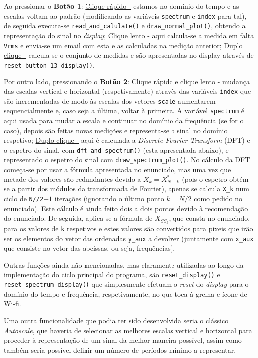 Ao pressionar o \textbf{Botão 1}: \uline{Clique rápido -} estamos no domínio do tempo e as escalas voltam ao padrão (modificando as variáveis \texttt{spectrum} e \texttt{index} para tal), de seguida executa-se \texttt{read\_and\_calulate()} e \texttt{draw\_normal\_plot()}, obtendo a representação do sinal no \textit{display}; \uline{Clique lento -} aqui calcula-se a medida em falta \texttt{Vrms} e envia-se um email com esta e as calculadas na medição anterior; \uline{Duplo clique -} calcula-se o conjunto de medidas e são apresentadas no display através de \texttt{reset\_button\_13\_display()}.

Por outro lado, pressionando o \textbf{Botão 2}: \uline{Clique rápido e clique lento -} mudança das escalas vertical e horizontal (respetivamente) através das variáveis \texttt{index} que são incrementadas de modo às escalas dos vetores \texttt{scale} aumentarem sequencialmente e, caso seja a última, voltar à primeira. A variável \texttt{spectrum} é aqui usada para mudar a escala e continuar no domínio da frequência (se for o caso), depois são feitas novas medições e representa-se o sinal no domínio respetivo; \uline{Duplo clique -} aqui é calculada a \textit{Discrete Fourier Transform} (DFT) e o espetro do sinal, com \texttt{dft\_and\_spectrum()} (esta apresentada abaixo), e representado o espetro do sinal com \texttt{draw\_spectrum\_plot()}. No cálculo da DFT começa-se por usar a fórmula apresentada no enunciado, mas uma vez que metade dos valores são redundantes devido a $X_{k}=X_{N-k}^{*}$ (pois o espetro obtém-se a partir dos módulos da transformada de Fourier), apenas se calcula \texttt{X\_k} num ciclo de \texttt{N//2}$-1$ iterações (ignorando o último ponto $k=N/2$ como pedido no enunciado). Este cálculo é ainda feito dois a dois pontos devido à recomendação do enunciado. De seguida, aplica-se a fórmula de $X_{SS_{k}}$, que consta no enunciado, para os valores de \texttt{k} respetivos e estes valores são convertidos para pixeis que irão ser os elementos do vetor das ordenadas \texttt{y\_aux} a devolver (juntamente com \texttt{x\_aux} que consiste no vetor das abcissas, ou seja, frequências).



Outras funções ainda não mencionadas, mas claramente utilizadas ao longo da implementação do ciclo principal do programa, são \texttt{reset\_display()} e \texttt{reset\_spectrum\_display()} que simplesmente efetuam o \textit{reset} do \textit{display} para o domínio do tempo e frequência, respetivamente, no que toca à grelha e ícone de Wi-fi. \newline

Uma outra funcionalidade que podia ter sido desenvolvida seria o clássico \textit{Autoscale}, que haveria de selecionar as melhores escalas vertical e horizontal para proceder à representação de um sinal da melhor maneira possível, assim como também seria possível definir um número de períodos mínimo a representar. 